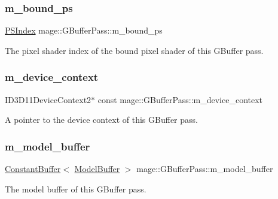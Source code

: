 \subsubsection{\texorpdfstring{m\+\_\+bound\+\_\+ps}{m\_bound\_ps}}
{\footnotesize\ttfamily \hyperlink{classmage_1_1_g_buffer_pass_a1dbae3cb33d9c90ce7eb8c119d576379}{P\+S\+Index} mage\+::\+G\+Buffer\+Pass\+::m\+\_\+bound\+\_\+ps\hspace{0.3cm}{\ttfamily [private]}}

The pixel shader index of the bound pixel shader of this G\+Buffer pass. \hypertarget{classmage_1_1_g_buffer_pass_a009ffc6f7d459b4bda115cfb470e1fd0}{}\label{classmage_1_1_g_buffer_pass_a009ffc6f7d459b4bda115cfb470e1fd0} 
\subsubsection{\texorpdfstring{m\+\_\+device\+\_\+context}{m\_device\_context}}
{\footnotesize\ttfamily I\+D3\+D11\+Device\+Context2$\ast$ const mage\+::\+G\+Buffer\+Pass\+::m\+\_\+device\+\_\+context\hspace{0.3cm}{\ttfamily [private]}}

A pointer to the device context of this G\+Buffer pass. \hypertarget{classmage_1_1_g_buffer_pass_a0538769957df6740993dbb479b7e05a2}{}\label{classmage_1_1_g_buffer_pass_a0538769957df6740993dbb479b7e05a2} 
\subsubsection{\texorpdfstring{m\+\_\+model\+\_\+buffer}{m\_model\_buffer}}
{\footnotesize\ttfamily \hyperlink{structmage_1_1_constant_buffer}{Constant\+Buffer}$<$ \hyperlink{structmage_1_1_model_buffer}{Model\+Buffer} $>$ mage\+::\+G\+Buffer\+Pass\+::m\+\_\+model\+\_\+buffer\hspace{0.3cm}{\ttfamily [private]}}

The model buffer of this G\+Buffer pass. \hypertarget{classmage_1_1_g_buffer_pass_ae607b9a6dab89d45865dc0ede3212fcd}{}\label{classmage_1_1_g_buffer_pass_ae607b9a6dab89d45865dc0ede3212fcd} 
